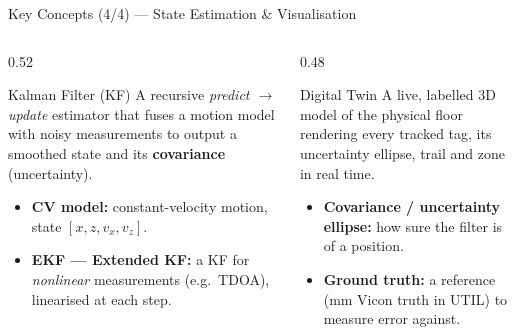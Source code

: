 \documentclass[aspectratio=169,10pt]{beamer}
\begin{document}
\begin{frame}{Key Concepts (4/4) --- State Estimation \& Visualisation}
  \begin{columns}[T]
    \begin{column}{0.52\textwidth}
      \begin{block}{Kalman Filter (KF)}
        \footnotesize A recursive \emph{predict $\to$ update} estimator that fuses a motion model with
        noisy measurements to output a smoothed state and its \textbf{covariance} (uncertainty).
      \end{block}
      \begin{itemize}\small
        \item \textbf{CV model:} constant-velocity motion, state $[x,z,v_x,v_z]$.
        \item \textbf{EKF --- Extended KF:} a KF for \emph{nonlinear} measurements (e.g.\ TDOA),
              linearised at each step.
      \end{itemize}
    \end{column}
    \begin{column}{0.48\textwidth}
      \begin{block}{Digital Twin}
        \footnotesize A live, labelled 3D model of the physical floor rendering every tracked tag,
        its uncertainty ellipse, trail and zone in real time.
      \end{block}
      \begin{itemize}\small
        \item \textbf{Covariance / uncertainty ellipse:} how sure the filter is of a position.
        \item \textbf{Ground truth:} a reference (mm Vicon truth in UTIL) to measure error against.
      \end{itemize}
    \end{column}
  \end{columns}
\end{frame}

\end{document}
